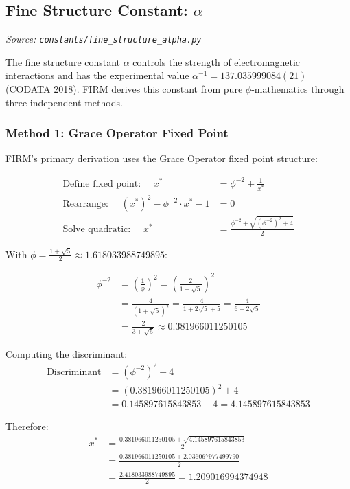 
\subsection{Fine Structure Constant: $\alpha$}
\textit{Source: \texttt{constants/fine\_structure\_alpha.py}}

The fine structure constant $\alpha$ controls the strength of electromagnetic interactions and has the experimental value $\alpha^{-1} = 137.035999084(21)$ (CODATA 2018). FIRM derives this constant from pure $\phi$-mathematics through three independent methods.

\subsubsection{Method 1: Grace Operator Fixed Point}

FIRM's primary derivation uses the Grace Operator fixed point structure:

\begin{align}
\text{Define fixed point: } \quad x^* &= \phi^{-2} + \frac{1}{x^*} \\
\text{Rearrange: } \quad (x^*)^2 - \phi^{-2} \cdot x^* - 1 &= 0 \\
\text{Solve quadratic: } \quad x^* &= \frac{\phi^{-2} + \sqrt{(\phi^{-2})^2 + 4}}{2}
\end{align}

With $\phi = \frac{1+\sqrt{5}}{2} \approx 1.618033988749895$:

\begin{align}
\phi^{-2} &= \left(\frac{1}{\phi}\right)^2 = \left(\frac{2}{1+\sqrt{5}}\right)^2 \\
&= \frac{4}{(1+\sqrt{5})^2} = \frac{4}{1 + 2\sqrt{5} + 5} = \frac{4}{6 + 2\sqrt{5}} \\
&= \frac{2}{3 + \sqrt{5}} \approx 0.381966011250105
\end{align}

Computing the discriminant:
\begin{align}
\text{Discriminant} &= (\phi^{-2})^2 + 4 \\
&= (0.381966011250105)^2 + 4 \\
&= 0.145897615843853 + 4 = 4.145897615843853
\end{align}

Therefore:
\begin{align}
x^* &= \frac{0.381966011250105 + \sqrt{4.145897615843853}}{2} \\
&= \frac{0.381966011250105 + 2.036067977499790}{2} \\
&= \frac{2.418033988749895}{2} = 1.209016994374948
\end{align}

